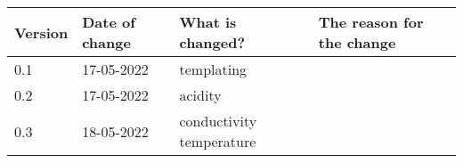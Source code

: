 \begin{tabular}{ | l | l | l | l |}
    \hline
    \textbf{Version} & \textbf{Date of change} & \textbf{What is changed?} & \textbf{The reason for the change} \\ \hline
    0.1 & 17-05-2022 & templating & \\
    0.2 & 17-05-2022 & acidity & \\
    0.3 & 18-05-2022 & conductivity temperature & \\
    
    \hline
\end{tabular}